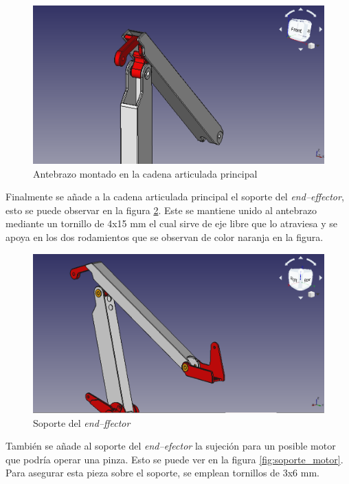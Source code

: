 \begin{figure}[H]
    \centering 
    \includegraphics[width=1\linewidth]{pictures/Antebrazo.png}
    \caption{Antebrazo montado en la cadena articulada principal}
    \label{fig:antebrazo}
\end{figure}

Finalmente se añade a la cadena articulada principal el soporte del \textit{end--effector}, esto se puede observar en la figura \ref{fig:soporte_endeffector}. Este se mantiene unido al antebrazo mediante un tornillo de 4x15 mm el cual sirve de eje libre que lo atraviesa y se apoya en los dos rodamientos que se observan de color naranja en la figura.

\begin{figure}[H]
    \centering 
    \includegraphics[width=1\linewidth]{pictures/SoporteEndEffector.png}
    \caption{Soporte del \textit{end--ffector}}
    \label{fig:soporte_endeffector}
\end{figure}

También se añade al soporte del \textit{end--efector} la sujeción para un posible motor que podría operar una pinza. Esto se puede ver en la figura \ref{fig:soporte_motor}. Para asegurar esta pieza sobre el soporte, se emplean tornillos de 3x6 mm.

